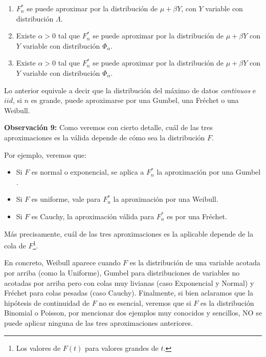 \documentclass[
]{book}
\providecommand{\tightlist}{%
  \setlength{\itemsep}{0pt}\setlength{\parskip}{0pt}}
\theoremstyle{definition}
\theoremstyle{definition}
\theoremstyle{definition}
\theoremstyle{definition}
\theoremstyle{remark}
\begin{document}
\begin{enumerate}
\def\labelenumi{\alph{enumi})}
\tightlist
\item
  \(F^{\ast}_n\) se puede aproximar por la distribución
  de \(\mu+\beta Y\), con \(Y\) variable con distribución \(\Lambda\).
\item
  Existe \(\alpha>0\) tal que \(F_n^{\ast}\) se puede aproximar por la distribución de \(\mu+\beta Y\) con \(Y\) variable con distribución \(\Phi_{\alpha}\).
\item
  Existe \(\alpha>0\) tal que \(F_n^{\ast}\) se puede aproximar por la distribución de \(\mu+\beta Y\) con \(Y\) variable con distribución \(\Phi_{\alpha}\).
\end{enumerate}

Lo anterior equivale a decir que la distribución del máximo de datos \emph{continuos} e \(iid\), si \(n\) es grande, puede aproximarse por una Gumbel, una Fréchet o una Weibull.

\textbf{Observación 9:} Como veremos con cierto detalle, cuál de las tres aproximaciones es la válida depende de cómo sea la distribución \(F\).

Por ejemplo, veremos que:

\begin{itemize}
\tightlist
\item
  Si \(F\) es normal o exponencial, se aplica a \(F_n^{\ast}\) la aproximación por una Gumbel .
\item
  Si \(F\) es uniforme, vale para \(F_n^{\ast}\) la aproximación por una Weibull.
\item
  Si \(F\) es Cauchy, la aproximación válida para \(F_n^{\ast}\) es por una Fréchet.
\end{itemize}

Más precisamente, cuál de las tres aproximaciones es la aplicable depende de la cola de \(F\)\footnote{Los valores de \(F(t)\) para valores grandes de \(t\).}.

En concreto, Weibull aparece cuando \(F\) es la
distribución de una variable acotada por arriba
(como la Uniforme), Gumbel para distribuciones
de variables no acotadas por arriba pero con colas muy livianas (caso Exponencial y Normal) y Fréchet para colas pesadas (caso Cauchy).
Finalmente, si bien aclaramos que la hipótesis de continuidad de \(F\) no es esencial, veremos que si \(F\) es la distribución Binomial o Poisson, por mencionar
dos ejemplos muy conocidos y sencillos, NO se
puede aplicar ninguna de las tres aproximaciones
anteriores.
\end{document}
